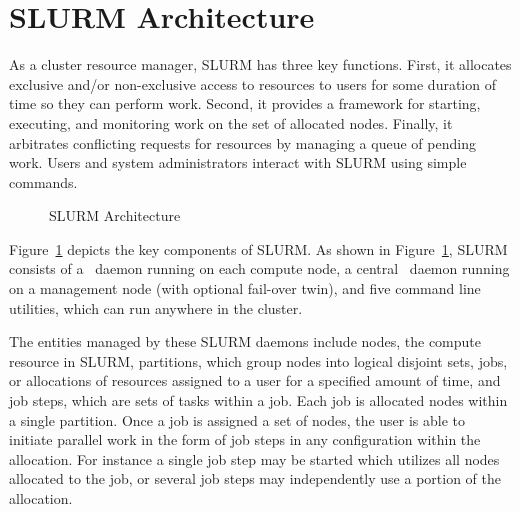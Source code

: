 \section{SLURM Architecture}

As a cluster resource manager, SLURM has three key functions.  First,
it allocates exclusive and/or non-exclusive access to resources to users for 
some duration of time so they can perform work.  Second, it provides 
a framework for starting, executing, and monitoring work  
on the set of allocated nodes.  Finally, it arbitrates 
conflicting requests for resources by managing a queue of pending work.
Users and system administrators interact with SLURM using simple commands.

%
%

\begin{figure}[tb]
\centerline{}
\caption{SLURM Architecture}
\label{arch}
\end{figure}

Figure~\ref{arch} depicts the key components of SLURM. As shown in Figure~\ref{arch},
SLURM consists of a \slurmd\ daemon
running on each compute node, a central \slurmctld\ daemon running on
a management node (with optional fail-over twin), and five command line
utilities,
which can run anywhere in the cluster.  

The entities managed by these SLURM daemons include nodes, the
compute resource in SLURM, partitions, which group nodes into
logical disjoint sets, jobs, or allocations of resources assigned
to a user for a specified amount of time, and job steps, which are
sets of tasks within a job.  
Each job is allocated nodes within a single partition. 
Once a job is assigned a set of nodes, the user is able to initiate
parallel work in the form of job steps in any configuration within the
allocation. For instance a single job step may be started which utilizes
all nodes allocated to the job, or several job steps may independently 
use a portion of the allocation.

